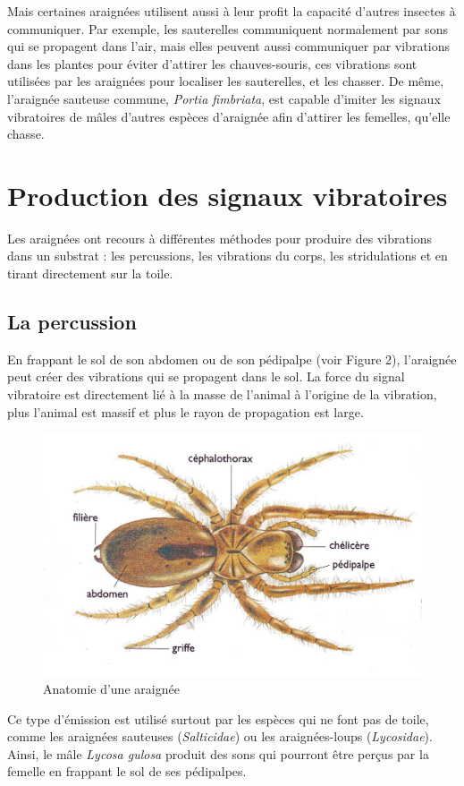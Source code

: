 Mais certaines araignées utilisent aussi à leur profit la capacité
d'autres insectes à communiquer. Par exemple, les sauterelles
communiquent normalement par sons qui se propagent dans l'air, mais
elles peuvent aussi communiquer par vibrations dans les plantes pour
éviter d'attirer les chauves-souris, ces vibrations sont utilisées par
les araignées pour localiser les sauterelles, et les chasser. De même,
l'araignée sauteuse commune, \emph{Portia fimbriata}, est capable
d'imiter les signaux vibratoires de mâles d'autres espèces d'araignée
afin d'attirer les femelles, qu'elle chasse.

\section{Production des signaux vibratoires}

Les araignées ont recours à différentes méthodes pour produire des
vibrations dans un substrat : les percussions, les vibrations du corps,
les stridulations et en tirant directement sur la toile.

\subsection{La percussion}

En frappant le sol de son abdomen ou de son pédipalpe (voir Figure 2),
l'araignée peut créer des vibrations qui se propagent dans le sol. La
force du signal vibratoire est directement lié à la masse de l'animal à
l'origine de la vibration, plus l'animal est massif et plus le rayon de
propagation est large.


\begin{figure}[htb!]
	\centering
	\includegraphics[width=0.7\linewidth]{../img/vibrations/anatomie_araignee}
	\caption{Anatomie d'une araignée}
	\label{fig:anatomie_araignee}
\end{figure}


Ce type d'émission est utilisé surtout par les espèces qui ne font pas
de toile, comme les araignées sauteuses (\emph{Salticidae}) ou les
araignées-loups (\emph{Lycosidae}). Ainsi, le mâle \emph{Lycosa gulosa}
produit des sons qui pourront être perçus par la femelle en frappant le
sol de ses pédipalpes.

